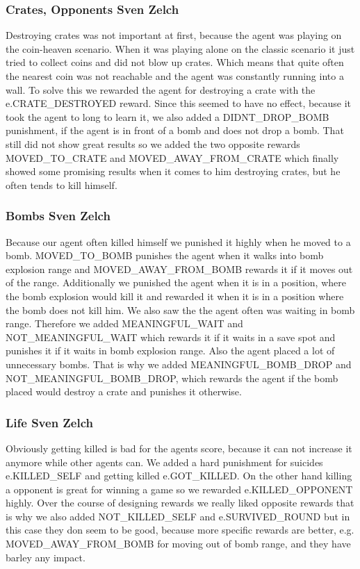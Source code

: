 \documentclass[
	letterpaper, %
	12pt, %
]{CSUniSchoolLabReport}
\begin{document}
\subsubsection{Crates, Opponents \tiny Sven Zelch}
Destroying crates was not important at first, because the agent was playing on the coin-heaven scenario.
When it was playing alone on the classic scenario it just tried to collect coins and did not blow up crates.
Which means that quite often the nearest coin was not reachable and the agent was constantly running into a wall.
To solve this we rewarded the agent for destroying a crate with the e.CRATE\_DESTROYED reward.
Since this seemed to have no effect, because it took the agent to long to learn it, we also added a DIDNT\_DROP\_BOMB punishment, if the agent is in front of a bomb and does not drop a bomb.
That still did not show great results so we added the two opposite rewards MOVED\_TO\_CRATE and MOVED\_AWAY\_FROM\_CRATE which finally showed some promising results when it comes to him destroying crates, but he often tends to kill himself.


\subsubsection{Bombs \tiny Sven Zelch}
Because our agent often killed himself we punished it highly when he moved to a bomb.
MOVED\_TO\_BOMB punishes the agent when it walks into bomb explosion range and MOVED\_AWAY\_FROM\_BOMB rewards it if it moves out of the range.
Additionally we punished the agent when it is in a position, where the bomb explosion would kill it and rewarded it when it is in a position where the bomb does not kill him.
We also saw the the agent often was waiting in bomb range.
Therefore we added MEANINGFUL\_WAIT and NOT\_MEANINGFUL\_WAIT which rewards it if it waits in a save spot and punishes it if it waits in bomb explosion range.
Also the agent placed a lot of unnecessary bombs.
That is why we added MEANINGFUL\_BOMB\_DROP and NOT\_MEANINGFUL\_BOMB\_DROP, which rewards the agent if the bomb placed would destroy a crate and punishes it otherwise.


\subsubsection{Life \tiny Sven Zelch}
Obviously getting killed is bad for the agents score, because it can not increase it anymore while other agents can.
We added a hard punishment for suicides e.KILLED\_SELF and getting killed e.GOT\_KILLED.
On the other hand killing a opponent is great for winning a game so we rewarded e.KILLED\_OPPONENT highly.
Over the course of designing rewards we really liked opposite rewards that is why we also added NOT\_KILLED\_SELF and e.SURVIVED\_ROUND but in this case they don seem to be good, because more specific rewards are better, e.g. MOVED\_AWAY\_FROM\_BOMB for moving out of bomb range, and they have barley any impact.
\end{document}
